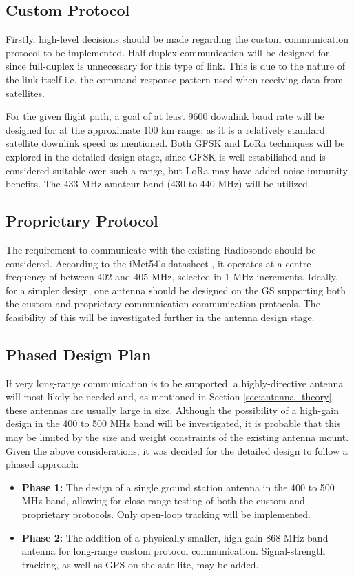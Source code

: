 \subsection{Custom Protocol}
Firstly, high-level decisions should be made regarding the custom communication protocol to be implemented. Half-duplex communication will be designed for, since full-duplex is unnecessary for this type of link. This is due to the nature of the link itself i.e. the command-response pattern used when receiving data from satellites.

For the given flight path, a goal of at least 9600 downlink baud rate will be designed for at the approximate 100 km range, as it is a relatively standard satellite downlink speed as mentioned. Both GFSK and LoRa techniques will be explored in the detailed design stage, since GFSK is well-estabilished and is considered suitable over such a range, but LoRa may have added noise immunity benefits. The 433 MHz amateur band (430 to 440 MHz) will be utilized.

\subsection{Proprietary Protocol}
The requirement to communicate with the existing Radiosonde should be considered. According to the iMet54's datasheet \cite{datasheet-iMet54}, it operates at a centre frequency of between 402 and 405 MHz, selected in 1 MHz increments. Ideally, for a simpler design, one antenna should be designed on the GS supporting both the custom and proprietary communication communication protocols. The feasibility of this will be investigated further in the antenna design stage.

\newpage
\subsection{Phased Design Plan}
If very long-range communication is to be supported, a highly-directive antenna will most likely be needed and, as mentioned in Section \ref{sec:antenna_theory}, these antennas are usually large in size. Although the possibility of a high-gain design in the 400 to 500 MHz band will be investigated, it is probable that this may be limited by the size and weight constraints of the existing antenna mount. Given the above considerations, it was decided for the detailed design to follow a phased approach:
\begin{itemize}
  \item \textbf{Phase 1:} The design of a single ground station antenna in the 400 to 500 MHz band, allowing for close-range testing of both the custom and proprietary protocols. Only open-loop tracking will be implemented.
  \item \textbf{Phase 2:} The addition of a physically smaller, high-gain 868 MHz band antenna for long-range custom protocol communication. Signal-strength tracking, as well as GPS on the satellite, may be added.
\end{itemize}

